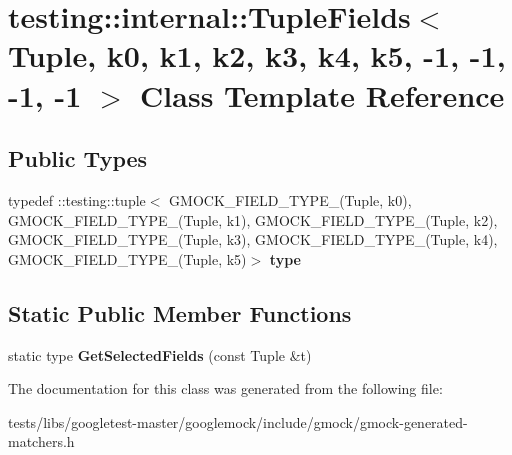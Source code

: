 \hypertarget{classtesting_1_1internal_1_1TupleFields_3_01Tuple_00_01k0_00_01k1_00_01k2_00_01k3_00_01k4_00_01k15c11b8436218f7eb1523adb30f3f284}{}\section{testing\+:\+:internal\+:\+:Tuple\+Fields$<$ Tuple, k0, k1, k2, k3, k4, k5, -\/1, -\/1, -\/1, -\/1 $>$ Class Template Reference}
\label{classtesting_1_1internal_1_1TupleFields_3_01Tuple_00_01k0_00_01k1_00_01k2_00_01k3_00_01k4_00_01k15c11b8436218f7eb1523adb30f3f284}
\subsection*{Public Types}
\begin{DoxyCompactItemize}
\item 
\mbox{\label{classtesting_1_1internal_1_1TupleFields_3_01Tuple_00_01k0_00_01k1_00_01k2_00_01k3_00_01k4_00_01k15c11b8436218f7eb1523adb30f3f284_a4e9aef3e026c3b30cfc21b6776616926}} 
typedef \+::testing\+::tuple$<$ G\+M\+O\+C\+K\+\_\+\+F\+I\+E\+L\+D\+\_\+\+T\+Y\+P\+E\+\_\+(Tuple, k0), G\+M\+O\+C\+K\+\_\+\+F\+I\+E\+L\+D\+\_\+\+T\+Y\+P\+E\+\_\+(Tuple, k1), G\+M\+O\+C\+K\+\_\+\+F\+I\+E\+L\+D\+\_\+\+T\+Y\+P\+E\+\_\+(Tuple, k2), G\+M\+O\+C\+K\+\_\+\+F\+I\+E\+L\+D\+\_\+\+T\+Y\+P\+E\+\_\+(Tuple, k3), G\+M\+O\+C\+K\+\_\+\+F\+I\+E\+L\+D\+\_\+\+T\+Y\+P\+E\+\_\+(Tuple, k4), G\+M\+O\+C\+K\+\_\+\+F\+I\+E\+L\+D\+\_\+\+T\+Y\+P\+E\+\_\+(Tuple, k5)$>$ {\bfseries type}
\end{DoxyCompactItemize}
\subsection*{Static Public Member Functions}
\begin{DoxyCompactItemize}
\item 
\mbox{\label{classtesting_1_1internal_1_1TupleFields_3_01Tuple_00_01k0_00_01k1_00_01k2_00_01k3_00_01k4_00_01k15c11b8436218f7eb1523adb30f3f284_a15b4c351182e3b52ec7ce67cb6beb0f8}} 
static type {\bfseries Get\+Selected\+Fields} (const Tuple \&t)
\end{DoxyCompactItemize}


The documentation for this class was generated from the following file\+:\begin{DoxyCompactItemize}
\item 
tests/libs/googletest-\/master/googlemock/include/gmock/gmock-\/generated-\/matchers.\+h\end{DoxyCompactItemize}
